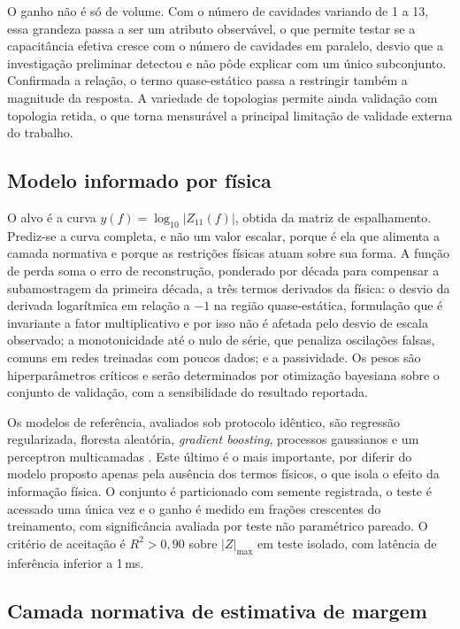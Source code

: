 O ganho não é só de volume. Com o número de cavidades variando de 1 a 13, essa
grandeza passa a ser um atributo observável, o que permite testar se a capacitância
efetiva cresce com o número de cavidades em paralelo, desvio que a investigação
preliminar detectou e não pôde explicar com um único subconjunto. Confirmada a
relação, o termo quase-estático passa a restringir também a magnitude da resposta. A
variedade de topologias permite ainda validação com topologia retida, o que torna
mensurável a principal limitação de validade externa do trabalho.

\subsection{Modelo informado por física}

O alvo é a curva $y(f) = \log_{10}|Z_{11}(f)|$, obtida da matriz de espalhamento.
Prediz-se a curva completa, e não um valor escalar, porque é ela que alimenta a
camada normativa e porque as restrições físicas atuam sobre sua forma. A função de
perda soma o erro de reconstrução, ponderado por década para compensar a
subamostragem da primeira década, a três termos derivados da física: o desvio da
derivada logarítmica em relação a $-1$ na região quase-estática, formulação que é
invariante a fator multiplicativo e por isso não é afetada pelo desvio de escala
observado; a monotonicidade até o nulo de série, que penaliza oscilações falsas,
comuns em redes treinadas com poucos dados; e a passividade. Os pesos são
hiperparâmetros críticos e serão determinados por otimização bayesiana sobre o
conjunto de validação, com a sensibilidade do resultado reportada.

Os modelos de referência, avaliados sob protocolo idêntico, são regressão
regularizada, floresta aleatória, \textit{gradient boosting}, processos gaussianos e
um perceptron multicamadas \citep{geron2022}. Este último é o mais importante, por
diferir do modelo proposto apenas pela ausência dos termos físicos, o que isola o
efeito da informação física. O conjunto é particionado com semente registrada, o
teste é acessado uma única vez e o ganho é medido em frações crescentes do
treinamento, com significância avaliada por teste não paramétrico pareado. O
critério de aceitação é $R^2 > 0{,}90$ sobre $|Z|_{\max}$ em teste isolado, com
latência de inferência inferior a 1\,ms.

\subsection{Camada normativa de estimativa de margem}
\label{subsec:normativa}

